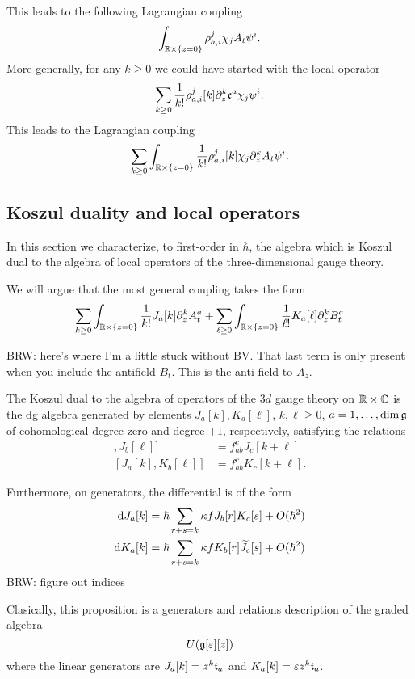 \documentclass[11pt]{amsart}
\def\ep{\varepsilon}
\def\zbar{{\overline{z}}}
\def\brian#1{{\textcolor{blue!65!red}{BRW: {#1}}}}
\begin{document}
This leads to the following Lagrangian coupling
\[
\int_{\mathbb R \times \{z=0\}} \rho_{a,i}^j \chi_j  A_t \psi^i  .
\]
More generally, for any $k \geq 0$ we could have started with the local operator 
\[
\sum_{k \geq 0} \frac1{k!} \rho_{a,i}^j [k] \partial_z^k \mathfrak c^a \chi_j \psi^i .
\]
This leads to the Lagrangian coupling
\[
\sum_{k \geq 0} \int_{\mathbb R \times \{z=0\}} \frac{1}{k!} \rho_{a,i}^j[k] \chi_j \partial_z^k A_t \psi^i .
\]



\subsection*{Koszul duality and local operators}

In this section we characterize, to first-order in $\hbar$, the algebra which is Koszul dual to the algebra of local operators of the three-dimensional gauge theory.

We will argue that the most general coupling takes the form
\[
\sum_{k \geq 0} \int_{\mathbb R \times \{z=0\}} \frac{1}{k!} J_a [k] \partial_z^k A^a_t + \sum_{\ell \geq 0} \int_{\mathbb R \times \{z=0\}} \frac{1}{\ell!} K_a[\ell] \partial_z^k B_t^a 
\] 

\brian{here's where I'm a little stuck without BV.
That last term is only present when you include the antifield $B_t$.
This is the anti-field to $A_{\zbar}$.
}

\begin{prop}
The Koszul dual to the algebra of operators of the $3d$ gauge theory on $\mathbb R \times \mathbb C$ is the dg algebra generated by elements $J_a[k],K_a [\ell]$, $k,\ell \geq 0$, $a = 1,\ldots, \dim \mathfrak g$ of cohomological degree zero and degree $+1$, respectively, satisfying the relations
\begin{align*}
[J_a [k] , J_b [\ell]] & = f_{ab}^c J_{c} [k+\ell] \\
[J_a [k], K_b[\ell]] & = f_{ab}^c K_c [k+\ell] .
\end{align*} 

Furthermore, on generators, the differential is of the form
\begin{align*}
{\rm d} J_a[k] & = \hbar \sum_{r + s = k} \kappa f J_b[r] K_c[s] + O(\hbar^2) \\
{\rm d} K_a[k] & = \hbar \sum_{r + s = k} \kappa f K_b[r] \widetilde{J}_c[s] + O(\hbar^2)
\end{align*} 
\brian{figure out indices}
\end{prop}

Clasically, this proposition is a generators and relations description of the graded algebra 
\[
U(\fg[\ep][z])
\]
where the linear generators are $J_a[k] = z^k \mathfrak t_a$ and $K_a [k] = \ep z^k \ft_a$. 
\end{document}
